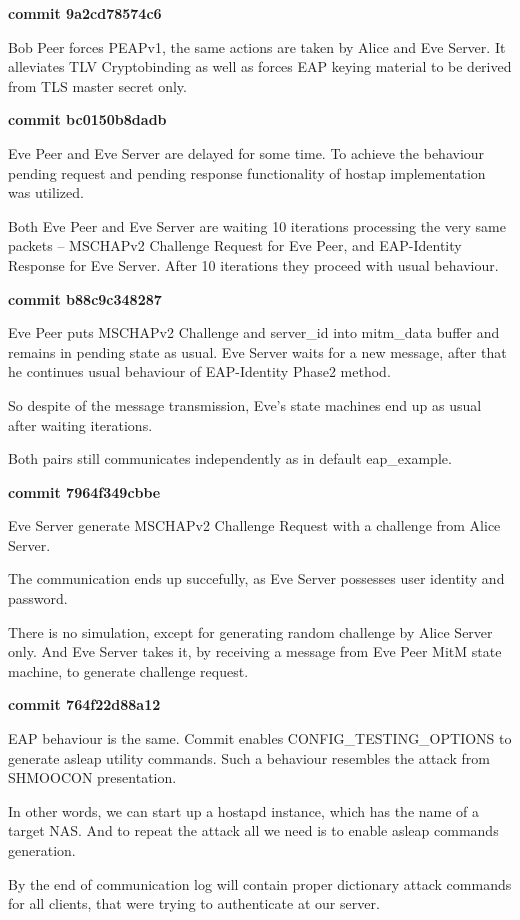 \documentclass{extarticle}
\begin{document}
\textbf{commit 9a2cd78574c6}

Bob Peer forces PEAPv1, the same actions are taken
by Alice and Eve Server. It alleviates TLV Cryptobinding
as well as forces EAP keying material to be derived
from TLS master secret only.

\textbf{commit bc0150b8dadb}

Eve Peer and Eve Server are delayed for some time.
To achieve the behaviour pending request and pending response
functionality of hostap implementation was utilized.

Both Eve Peer and Eve Server are waiting 10 iterations
processing the very same packets -- MSCHAPv2 Challenge Request
for Eve Peer,
and EAP-Identity Response for Eve Server.
After 10 iterations they proceed with usual behaviour.

\textbf{commit b88c9c348287}

Eve Peer puts MSCHAPv2 Challenge and server\_id into mitm\_data
buffer and remains in pending state as usual.
Eve Server waits for a new message,
after that he continues usual behaviour of EAP-Identity Phase2 method.

So despite of the message transmission,
Eve's state machines end up as usual after waiting iterations.

Both pairs still communicates independently as in default eap\_example.

\textbf{commit 7964f349cbbe}

Eve Server generate MSCHAPv2 Challenge Request with a challenge
from Alice Server.

The communication ends up succefully, as Eve Server possesses
user identity and password.

There is no simulation, except for generating random challenge
by Alice Server only. And Eve Server takes it, by receiving
a message from Eve Peer MitM state machine, to generate
challenge request.

\textbf{commit  764f22d88a12}

EAP behaviour is the same. Commit enables CONFIG\_TESTING\_OPTIONS
to generate asleap utility commands. Such a behaviour
resembles the attack from SHMOOCON presentation.

In other words, we can start up a hostapd instance, which
has the name of a target NAS. And to repeat the attack
all we need is to enable asleap commands generation.

By the end of communication log will contain proper
dictionary attack commands for all clients, that
were trying to authenticate at our server.
\end{document}
